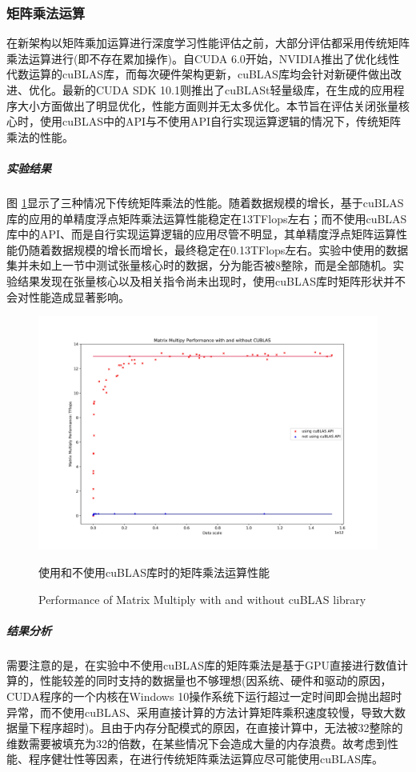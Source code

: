 \subsubsection{矩阵乘法运算}
\par 在新架构以矩阵乘加运算进行深度学习性能评估之前，大部分评估都采用传统矩阵乘法运算进行(即不存在累加操作)。自CUDA 6.0开始，NVIDIA推出了优化线性代数运算的cuBLAS库，而每次硬件架构更新，cuBLAS库均会针对新硬件做出改进、优化。最新的CUDA SDK 10.1则推出了cuBLASt轻量级库，在生成的应用程序大小方面做出了明显优化，性能方面则并无太多优化。本节旨在评估关闭张量核心时，使用cuBLAS中的API与不使用API自行实现运算逻辑的情况下，传统矩阵乘法的性能。
\subparagraph{实验结果}
\par 图 \ref{Fig.CUBLASPerf}显示了三种情况下传统矩阵乘法的性能。随着数据规模的增长，基于cuBLAS库的应用的单精度浮点矩阵乘法运算性能稳定在13TFlops左右；而不使用cuBLAS库中的API、而是自行实现运算逻辑的应用尽管不明显，其单精度浮点矩阵运算性能仍随着数据规模的增长而增长，最终稳定在0.13TFlops左右。实验中使用的数据集并未如上一节中测试张量核心时的数据，分为能否被8整除，而是全部随机。实验结果发现在张量核心以及相关指令尚未出现时，使用cuBLAS库时矩阵形状并不会对性能造成显著影响。
\begin{figure}
	\centering
	\includegraphics[width=15cm]{figures/CUBLASPerf.jpg}
	\renewcommand{\thefigure}{\arabic{section}-\arabic{figure} }
	\renewcommand{\figurename}{图}
	\caption{使用和不使用cuBLAS库时的矩阵乘法运算性能}
	\addtocounter{figure}{-1}
	\renewcommand{\thefigure}{\arabic{section}-\arabic{figure} }
	\renewcommand{\figurename}{Figure}
	\caption{Performance of Matrix Multiply with and without cuBLAS library}
	\label{Fig.CUBLASPerf}
\end{figure}
\subparagraph{结果分析}
\par 需要注意的是，在实验中不使用cuBLAS库的矩阵乘法是基于GPU直接进行数值计算的，性能较差的同时支持的数据量也不够理想(因系统、硬件和驱动的原因，CUDA程序的一个内核在Windows 10操作系统下运行超过一定时间即会抛出超时异常，而不使用cuBLAS、采用直接计算的方法计算矩阵乘积速度较慢，导致大数据量下程序超时)。且由于内存分配模式的原因，在直接计算中，无法被32整除的维数需要被填充为32的倍数，在某些情况下会造成大量的内存浪费。故考虑到性能、程序健壮性等因素，在进行传统矩阵乘法运算应尽可能使用cuBLAS库。

